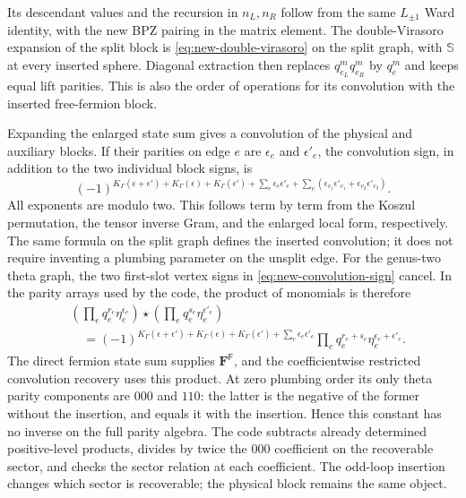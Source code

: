 Its descendant values and the recursion in $n_L,n_R$ follow from
the same $L_{\pm1}$ Ward identity, with the new BPZ pairing in the
matrix element.  The double-Virasoro expansion of the split block is
\eqref{eq:new-double-virasoro} on the split graph, with
$\mathbb S$ at every inserted sphere.  Diagonal extraction then
replaces $q_{e_L}^m q_{e_R}^m$ by $q_e^m$ and keeps equal lift
parities.  This is also the order of operations for its convolution
with the inserted free-fermion block.

Expanding the enlarged state sum gives a convolution of the physical
and auxiliary blocks.  If their parities on edge $e$ are $\epsilon_e$
and $\epsilon'_e$, the convolution sign, in addition to the two
individual block signs, is
\begin{equation}
 (-1)^{K_\Gamma(\epsilon+\epsilon')+K_\Gamma(\epsilon)
          +K_\Gamma(\epsilon')
          +\sum_e\epsilon_e\epsilon'_e
          +\sum_v(\epsilon_{v_1}\epsilon'_{v_1}
                   +\epsilon_{v_2}\epsilon'_{v_3})}.
 \label{eq:new-convolution-sign}
\end{equation}
All exponents are modulo two.  This follows term by term from
the Koszul permutation, the tensor inverse Gram, and the enlarged
local form, respectively.  The same formula on the split graph
defines the inserted convolution; it does not require inventing a
plumbing parameter on the unsplit edge.
For the genus-two theta graph, the two first-slot vertex signs in
\eqref{eq:new-convolution-sign} cancel.  In the parity arrays used by
the code, the product of monomials is therefore
\begin{align}
 &\left(\prod_e q_e^{r_e}\eta_e^{\epsilon_e}\right)
 \star\left(\prod_e q_e^{s_e}\eta_e^{\epsilon'_e}\right)\nonumber\\
 &\quad=(-1)^{K_\Gamma(\epsilon+\epsilon')+K_\Gamma(\epsilon)
                +K_\Gamma(\epsilon')+\sum_e\epsilon_e\epsilon'_e}
 \prod_e q_e^{r_e+s_e}\eta_e^{\epsilon_e+\epsilon'_e}.
 \label{eq:new-theta-convolution}
\end{align}
The direct fermion state sum supplies $\mathbf F^{\mathsf F}$,
and the coefficientwise restricted convolution recovery uses this
product.
At zero plumbing order its only theta parity components are $000$
and $110$: the latter is the negative of the former without the
insertion, and equals it with the insertion.  Hence this constant
has no inverse on the full parity algebra.  The code subtracts
already determined positive-level products, divides by twice the
$000$ coefficient on the recoverable sector, and checks the sector
relation at each coefficient.  The odd-loop insertion changes which
sector is recoverable; the physical block remains the same object.

